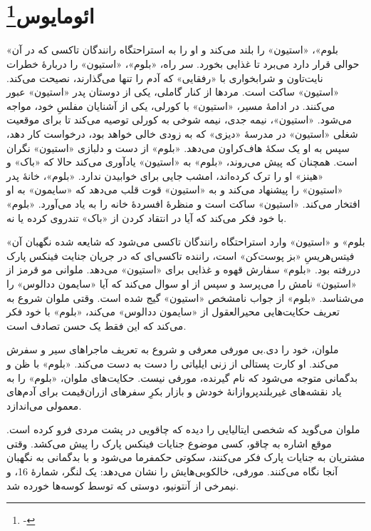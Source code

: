 \documentclass[12pt]{book}
\newcommand{\noun}[1]{«{#1}»}
\begin{document}
    \chapter[ائومایوس]{ائومایوس\protect\footnote{-}}\label{ep:16}
    \noun{بلوم}، \noun{استیون} را بلند می‌کند و او را به استراحتگاه رانندگان تاکسی که در آن حوالی قرار دارد می‌برد تا غذایی بخورد. سر راه، \noun{بلوم}، \noun{استیون} را دربارۀ خطرات نایت‌تاون و شرابخواری با «رفقایی» که آدم را تنها می‌گذارند، نصیحت می‌کند. \noun{استیون} ساکت است. مردها از کنار گاملی، یکی از دوستان پدر \noun{استیون} عبور می‌کنند. در ادامۀ مسیر، \noun{استیون} با کورلی، یکی از آشنایان مفلسِ خود، مواجه می‌شود. \noun{استیون}، نیمه جدی، نیمه شوخی به کورلی توصیه می‌کند تا برای موقعیت شغلی \noun{استیون} در مدرسۀ \noun{دیزی} که به زودی خالی خواهد بود، درخواست کار دهد، سپس به او یک سکۀ هاف‌کراون می‌دهد. \noun{بلوم} از دست و دلبازی \noun{استیون} نگران است. همچنان که پیش می‌روند، \noun{بلوم} به \noun{استیون} یادآوری می‌کند حالا که \noun{باک}  و \noun{هینز}  او را ترک کرده‌اند، امشب جایی برای خوابیدن ندارد. \noun{بلوم}، خانۀ پدر \noun{استیون} را پیشنهاد می‌کند و به \noun{استیون} قوت قلب می‌دهد که \noun{سایمون}  به او افتخار می‌کند. \noun{استیون} ساکت است و منظرۀ افسردۀ خانه را به یاد می‌آورد. \noun{بلوم} با خود فکر می‌کند که آیا در انتقاد کردن از \noun{باک}  تندروی کرده یا نه.

    \noun{بلوم} و \noun{استیون} وارد استراحتگاه رانندگان تاکسی می‌شود که شایعه شده نگهبان آن فیتس‌هریسِ «بز پوست‌کن» است، راننده تاکسی‌ای که در جریان جنایت فینکس پارک دررفته بود. \noun{بلوم} سفارش قهوه و غذایی برای \noun{استیون} می‌دهد. ملوانی مو قرمز از \noun{استیون} نامش را می‌پرسد و سپس از او سوال می‌کند که آیا \noun{سایمون ددالوس‬} را می‌شناسد. \noun{بلوم} از جواب نامشخص \noun{استیون} گیج شده است. وقتی ملوان شروع به تعریف حکایت‌هایی محیرالعقول از \noun{سایمون ددالوس‬} می‌کند، \noun{بلوم} با خود فکر می‌کند که این فقط یک حسن تصادف است.

    ملوان، خود را دی.بی مورفی معرفی و شروع به تعریف ماجراهای سیر و سفرش می‌کند. او کارت پستالی از زنی ایلیاتی را دست به دست می‌کند. \noun{بلوم} با ظن و بدگمانی متوجه می‌شود که نام گیرنده، مورفی نیست. حکایت‌های ملوان، \noun{بلوم} را به یاد نقشه‌های غیربلندپروازانۀ خودش و بازار بکرِ سفرهای ازران‌قیمت برای آدم‌های معمولی می‌اندازد.

    ملوان می‌گوید که شخصی ایتالیایی را دیده که چاقویی در پشت مردی فرو کرده است. موقع اشاره به چاقو، کسی موضوع جنایات فینکس پارک را پیش می‌کشد. وقتی مشتریان به جنایات پارک فکر می‌کنند، سکوتی حکمفرما می‌شود و با بدگمانی به نگهبان آنجا نگاه می‌کنند. مورفی، خالکوبی‌هایش را نشان می‌دهد: یک لنگر، شمارۀ 16، و نیمرخی از آنتونیو، دوستی که توسط کوسه‌ها خورده شد.
\end{document}
